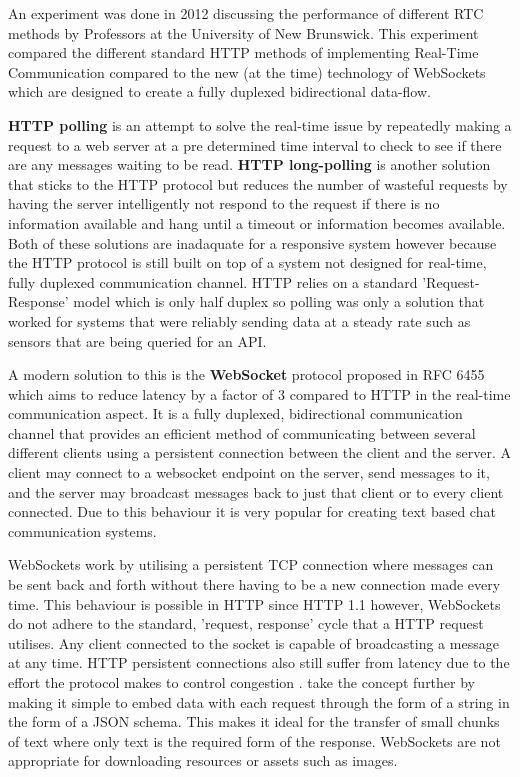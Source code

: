 An experiment was done in 2012 discussing the performance of different RTC methods by Professors at the University of New Brunswick\cite{websocket}. This experiment compared the different standard HTTP methods of implementing Real-Time Communication compared to the new (at the time) technology of WebSockets which are designed to create a fully duplexed bidirectional data-flow.

\textbf{HTTP polling} is an attempt to solve the real-time issue by repeatedly making a request to a web server at a pre determined time interval to check to see if there are any messages waiting to be read.  \textbf{HTTP long-polling} is another solution that sticks to the HTTP protocol but reduces the number of wasteful requests by having the server intelligently not respond to the request if there is no information available and hang until a timeout or information becomes available. Both of these solutions are inadaquate for a responsive system however because the HTTP protocol is still built on top of a system not designed for real-time, fully duplexed communication channel. HTTP relies on a standard 'Request-Response' model which is only half duplex so polling was only a solution that worked for systems that were reliably sending data at a steady rate such as sensors that are being queried for an API.

A modern solution to this is the \textbf{WebSocket} protocol proposed in RFC 6455 \cite{wsrfc} which aims to reduce latency by a factor of 3 compared to HTTP in the real-time communication aspect. It is a fully duplexed, bidirectional communication channel that provides an efficient method of communicating between several different clients using a persistent connection between the client and the server. A client may connect to a websocket endpoint on the server, send messages to it, and the server may broadcast messages back to just that client or to every client connected. Due to this behaviour it is very popular for creating text based chat communication systems.

WebSockets work by utilising a persistent TCP connection where messages can be sent back and forth without there having to be a new connection made every time. This behaviour is possible in HTTP since HTTP 1.1 however, WebSockets do not adhere to the standard, 'request, response' cycle that a HTTP request utilises. Any client connected to the socket is capable of broadcasting a message at any time. HTTP persistent connections also still suffer from latency due to the effort the protocol makes to control congestion \cite{httpvsws}. take the concept further by making it simple to embed data with each request through the form of a string in the form of a JSON schema. This makes it ideal for the transfer of small chunks of text where only text is the required form of the response. WebSockets are not appropriate for downloading resources or assets such as images.

